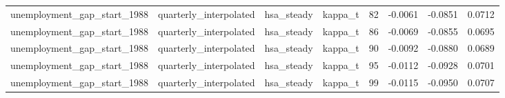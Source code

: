 \begin{tabular}{llllrrrr}
unemployment\_gap\_start\_1988 & quarterly\_interpolated & hsa\_steady & kappa\_t & 82 & -0.0061 & -0.0851 & 0.0712 \\
unemployment\_gap\_start\_1988 & quarterly\_interpolated & hsa\_steady & kappa\_t & 86 & -0.0069 & -0.0855 & 0.0695 \\
unemployment\_gap\_start\_1988 & quarterly\_interpolated & hsa\_steady & kappa\_t & 90 & -0.0092 & -0.0880 & 0.0689 \\
unemployment\_gap\_start\_1988 & quarterly\_interpolated & hsa\_steady & kappa\_t & 95 & -0.0112 & -0.0928 & 0.0701 \\
unemployment\_gap\_start\_1988 & quarterly\_interpolated & hsa\_steady & kappa\_t & 99 & -0.0115 & -0.0950 & 0.0707 \\
\bottomrule
\end{tabular}
